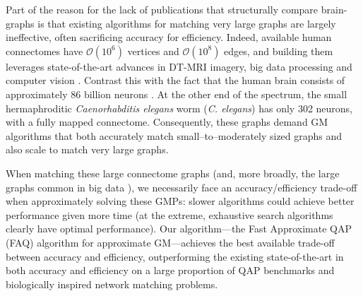 \documentclass[10pt]{article}
\providecommand{\mc}[1]{\mathcal{#1}}
\providecommand{\mc}[1]{\mathcal{#1}}
\begin{document}
Part of the reason for the lack of publications that structurally compare brain-graphs is that existing algorithms for matching very large graphs are largely ineffective, often sacrificing accuracy for efficiency.
Indeed, available human connectomes have $\mc{O}(10^6)$ vertices and $\mc{O}(10^8)$ edges, and building them leverages state-of-the-art advances in DT-MRI imagery, big data processing and computer vision \cite{MIGRAINE}.  %
Contrast this with the fact that the human brain consists of approximately 86 billion neurons \cite{Herculano-Houzel2012}.   
At the other end of the spectrum, the small hermaphroditic  \emph{Caenorhabditis elegans} worm (\emph{C. elegans}) has only 302 neurons, with a fully mapped connectome.  
Consequently, these graphs demand GM algorithms that both accurately match small--to--moderately sized graphs and also
scale to match very large graphs. 



When matching these large connectome graphs (and, more broadly, the large graphs common in big data \cite{Kolaczyk2010}), we
necessarily 
face an accuracy/efficiency trade-off when approximately solving these GMPs: slower algorithms could achieve better performance given more time (at the extreme, exhaustive search algorithms clearly have optimal performance).
Our algorithm---the Fast Approximate QAP (FAQ) algorithm for approximate GM---achieves the best available trade-off between accuracy and efficiency, outperforming the existing state-of-the-art in both accuracy and efficiency on a large proportion of QAP benchmarks and biologically inspired network matching problems.
\end{document}
